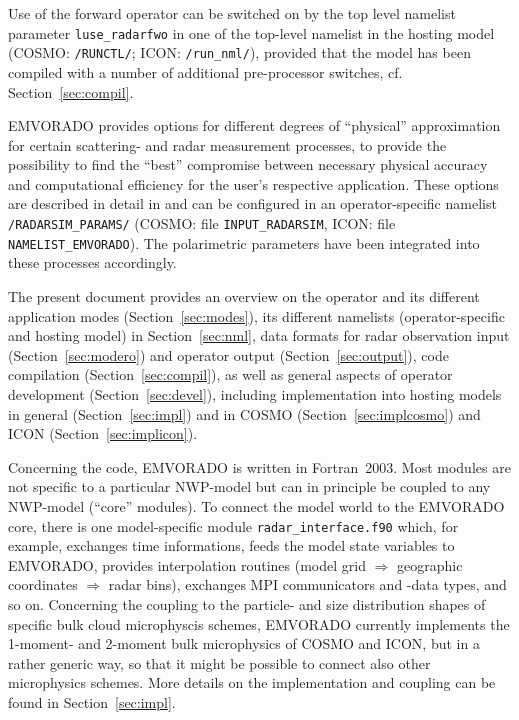 \documentclass[10pt,a4paper,twoside,headinclude,footinclude,parskip=half]{scrartcl}
\newcommand{\citeP}[1]{\citet{#1}}
\newcommand{\srcform}[1]{\mbox{\texttt{#1}}\xspace}%
\begin{document}
Use of the forward operator can be switched on by the top level namelist parameter \srcform{luse_radarfwo} in one of the
top-level namelist in the hosting model (COSMO: \srcform{/RUNCTL/}; ICON: \srcform{/run_nml/}),
provided that the model has been compiled with a number of additional pre-processor switches, cf. Section~\ref{sec:compil}.

EMVORADO provides options for different degrees of ``physical'' approximation for certain scattering- and radar measurement
processes, to provide the possibility to find the ``best'' compromise between
necessary physical accuracy and computational efficiency for the user's respective application.
These options are described in detail in \citeP{zeng2016a} and can be configured in
an operator-specific namelist \srcform{/RADARSIM_PARAMS/} (COSMO: file \srcform{INPUT_RADARSIM}, ICON: file \srcform{NAMELIST_EMVORADO}).
The polarimetric parameters have been integrated into these processes accordingly.

The present document provides an overview on the operator and its different
application modes (Section~\ref{sec:modes}), its different namelists
(operator-specific and hosting model) in Section~\ref{sec:nml},
data formats for radar observation input (Section~\ref{sec:modero})
and operator output (Section~\ref{sec:output}), code compilation (Section~\ref{sec:compil}),
as well as general aspects of operator development (Section~\ref{sec:devel}), including implementation
into hosting models in general (Section~\ref{sec:impl}) and in COSMO (Section~\ref{sec:implcosmo}) and ICON (Section~\ref{sec:implicon}).


Concerning the code, EMVORADO is written in Fortran~2003. Most modules are not specific
to a particular NWP-model but can in principle be coupled to any NWP-model (``core'' modules).
To connect the model world to the EMVORADO core, there is one model-specific
module \srcform{radar_interface.f90} which, for example, exchanges time informations, feeds the model state variables to EMVORADO,
provides interpolation routines (model grid $\Longrightarrow$ geographic coordinates $\Longrightarrow$ radar bins),
exchanges MPI communicators and -data types, and so on. Concerning the coupling to the particle- and size distribution shapes of specific bulk cloud microphyscis schemes,
EMVORADO currently implements the 1-moment- and 2-moment bulk microphysics of COSMO and ICON, but in a rather generic way, so that it might be
possible to connect also other microphysics schemes.
More details on the implementation
and coupling can be found in Section~\ref{sec:impl}.
\end{document}
